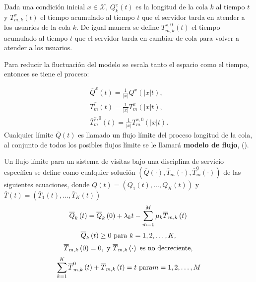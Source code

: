 Dada una condici\'on inicial $x\in\mathcal{X}$, $Q_{k}^{x}\left(t\right)$ es la longitud de la cola $k$ al tiempo $t$
y $T_{m,k}^{x}\left(t\right)$  el tiempo acumulado al tiempo $t$ que el servidor tarda en atender a los usuarios de la cola $k$.
De igual manera se define $T_{m,k}^{x,0}\left(t\right)$ el tiempo acumulado al tiempo $t$ que el servidor tarda en
cambiar de cola para volver a atender a los usuarios.

Para reducir la fluctuaci\'on del modelo se escala tanto el espacio como el tiempo, entonces se
tiene el proceso:

\begin{eqnarray}
\overline{Q}^{x}\left(t\right)=\frac{1}{|x|}Q^{x}\left(|x|t\right),\\
\overline{T}_{m}^{x}\left(t\right)=\frac{1}{|x|}T_{m}^{x}\left(|x|t\right),\\
\overline{T}_{m}^{x,0}\left(t\right)=\frac{1}{|x|}T_{m}^{x,0}\left(|x|t\right).
\end{eqnarray}
Cualquier l\'imite $\overline{Q}\left(t\right)$ es llamado un
flujo l\'imite del proceso longitud de la cola, al conjunto de todos los posibles flujos l\'imite
se le llamar\'a \textbf{modelo de flujo}, (\cite{MaynDown}).

\begin{Def}
Un flujo l\'imite para un sistema de visitas bajo una disciplina de
servicio espec\'ifica se define como cualquier soluci\'on
 $\left(\overline{Q}\left(\cdot\right),\overline{T}_{m}\left(\cdot\right),\overline{T}_{m}^{0}\left(\cdot\right)\right)$
 de las siguientes ecuaciones, donde
$\overline{Q}\left(t\right)=\left(\overline{Q}_{1}\left(t\right),\ldots,\overline{Q}_{K}\left(t\right)\right)$
y
$\overline{T}\left(t\right)=\left(\overline{T}_{1}\left(t\right),\ldots,\overline{T}_{K}\left(t\right)\right)$
\begin{equation}\label{Eq.3.8}
\overline{Q}_{k}\left(t\right)=\overline{Q}_{k}\left(0\right)+\lambda_{k}t-\sum_{m=1}^{M}\mu_{k}\overline{T}_{m,k}\left(t\right)\\
\end{equation}
\begin{equation}\label{Eq.3.9}
\overline{Q}_{k}\left(t\right)\geq0\textrm{ para }k=1,2,\ldots,K,\\
\end{equation}
\begin{equation}\label{Eq.3.10}
\overline{T}_{m,k}\left(0\right)=0,\textrm{ y }\overline{T}_{m,k}\left(\cdot\right)\textrm{ es no decreciente},\\
\end{equation}
\begin{equation}\label{Eq.3.11}
\sum_{k=1}^{K}\overline{T}_{m,k}^{0}\left(t\right)+\overline{T}_{m,k}\left(t\right)=t\textrm{ para}m=1,2,\ldots,M\\
\end{equation}
\end{Def}

